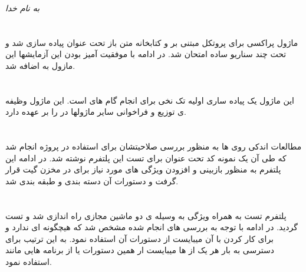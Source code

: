 \documentclass[11pt]{article}
\title{\lr{F-Bridge Development}}
\author{پرهام الوانی}
\begin{document}
	\begin{titlepage}
		\begin{center}
			\emph{به نام خدا}
		\end{center}
		\maketitle
	\end{titlepage}
	\tableofcontents
	\newpage
	\section{}
	ماژول پراکسی برای پروتکل  مبتنی بر  و کتابخانه متن باز  تحت عنوان  پیاده سازی شد و تحت چند سناریو ساده امتحان شد. 
	در ادامه با موفقیت آمیز بودن این آزمایشها این مازول به  اضافه شد.
	\section{}
	این ماژول یک پیاده ساری اولیه تک نخی برای انجام گام های  است. این ماژول وظیفه ی توزیع و فراخوانی سایر ماژولها در  را بر عهده دارد.
	\section{}
	مطالعات اندکی روی  ها به منظور بررسی صلاحیتشان برای استفاده در پروژه انجام شد که طی آن یک نمونه کد تحت عنوان  برای تست این پلتفرم نوشته شد. در ادامه  این پلتفرم 
	به منظور بازبینی و افزودن ویژگی های مورد نیاز برای  در مخزن گیت قرار گرفت و دستورات آن دسته بندی و طبقه بندی شد.
	\section{}
	پلتفرم تست  به همراه ویژگی  به وسیله ی دو ماشین مجازی  راه اندازی شد و تست گردید. در ادامه با توجه به بررسی های انجام شده مشخص شد که  هیچگونه  ای ندارد و برای کار کردن با آن
	میبایست از دستورات آن استفاده نمود. به این ترتیب برای دسترسی به بار هر یک از  ها میبایست ار همین دستورات یا از برنامه هایی مانند  استفاده نمود.
\end{document}
